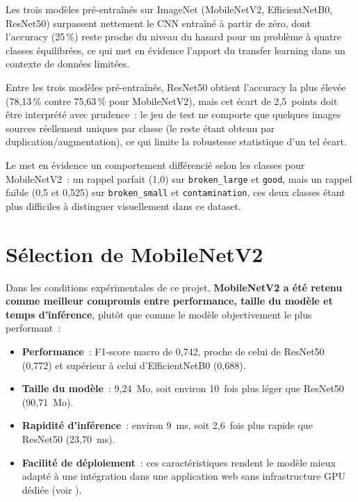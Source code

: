 Les trois mod\`eles pr\'e-entra\^in\'es sur ImageNet (MobileNetV2, EfficientNetB0, ResNet50) surpassent nettement le CNN entra\^in\'e \`a partir de z\'ero, dont l'accuracy (25\,\%) reste proche du niveau du hasard pour un probl\`eme \`a quatre classes \'equilibr\'ees, ce qui met en \'evidence l'apport du transfer learning dans un contexte de donn\'ees limit\'ees.

Entre les trois mod\`eles pr\'e-entra\^in\'es, ResNet50 obtient l'accuracy la plus \'elev\'ee (78,13\,\% contre 75,63\,\% pour MobileNetV2), mais cet \'ecart de 2,5~points doit \^etre interpr\'et\'e avec prudence~: le jeu de test ne comporte que quelques images sources r\'eellement uniques par classe (le reste \'etant obtenu par duplication/augmentation), ce qui limite la robustesse statistique d'un tel \'ecart.

Le  met en \'evidence un comportement diff\'erenci\'e selon les classes pour MobileNetV2~: un rappel parfait (1,0) sur \texttt{broken\_large} et \texttt{good}, mais un rappel faible (0,5 et 0,525) sur \texttt{broken\_small} et \texttt{contamination}, ces deux classes \'etant plus difficiles \`a distinguer visuellement dans ce dataset.

\section{S\'election de MobileNetV2}
\label{sec:selection-mobilenet}

Dans les conditions exp\'erimentales de ce projet, \textbf{MobileNetV2 a \'et\'e retenu comme meilleur compromis entre performance, taille du mod\`ele et temps d'inf\'erence}, plut\^ot que comme le mod\`ele objectivement le plus performant~:
\begin{itemize}
  \item \textbf{Performance}~: F1-score macro de 0,742, proche de celui de ResNet50 (0,772) et sup\'erieur \`a celui d'EfficientNetB0 (0,688).
  \item \textbf{Taille du mod\`ele}~: 9,24~Mo, soit environ 10~fois plus l\'eger que ResNet50 (90,71~Mo).
  \item \textbf{Rapidit\'e d'inf\'erence}~: environ 9~ms, soit 2,6~fois plus rapide que ResNet50 (23,70~ms).
  \item \textbf{Facilit\'e de d\'eploiement}~: ces caract\'eristiques rendent le mod\`ele mieux adapt\'e \`a une int\'egration dans une application web sans infrastructure GPU d\'edi\'ee (voir ).
\end{itemize}

